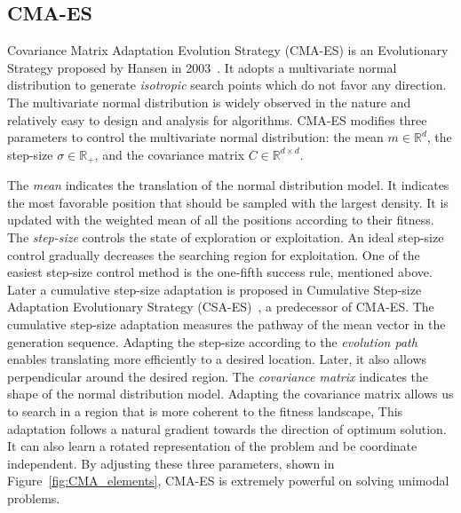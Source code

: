 \subsection{CMA-ES}
Covariance Matrix Adaptation Evolution Strategy (CMA-ES) is an Evolutionary Strategy 
proposed by Hansen in 2003~\cite{Hansen:2003:CMA_ES}.
It adopts a multivariate normal distribution to generate \textit{isotropic} search points which do not favor any direction.
The multivariate normal distribution is widely observed in the nature and relatively easy to design and analysis for algorithms.
CMA-ES modifies three parameters to control the multivariate normal distribution: 
the mean $m \in \mathbb{R}^d$, the step-size $\sigma \in \mathbb{R}_+$, and the covariance matrix $C \in \mathbb{R}^{d \times d}$.


The \textit{mean} indicates the translation of the normal distribution model.
It indicates the most favorable position that should be sampled with the largest density.
It is updated with the weighted mean of all the positions according to their fitness.
The \textit{step-size} controls the state of exploration or exploitation.
An ideal step-size control gradually decreases the searching region for exploitation.
One of the easiest step-size control method is the one-fifth success rule, mentioned above.
Later a cumulative step-size adaptation is proposed in 
Cumulative Step-size Adaptation Evolutionary Strategy (CSA-ES)~\cite{Hansen:2001:CSA_ES}, a predecessor of CMA-ES.
The cumulative step-size adaptation measures the pathway of the mean vector in the generation sequence.
Adapting the step-size according to the \textit{evolution path} enables translating more efficiently to a desired location.
Later, it also allows perpendicular around the desired region.
The \textit{covariance matrix} indicates the shape of the normal distribution model.
Adapting the covariance matrix allows us to search in a region that is more coherent to the fitness landscape, 
This adaptation follows a natural gradient towards the direction of optimum solution.
It can also learn a rotated representation of the problem and be coordinate independent. 
By adjusting these three parameters, shown in Figure~\ref{fig:CMA_elements}, CMA-ES is extremely powerful on solving unimodal problems.

